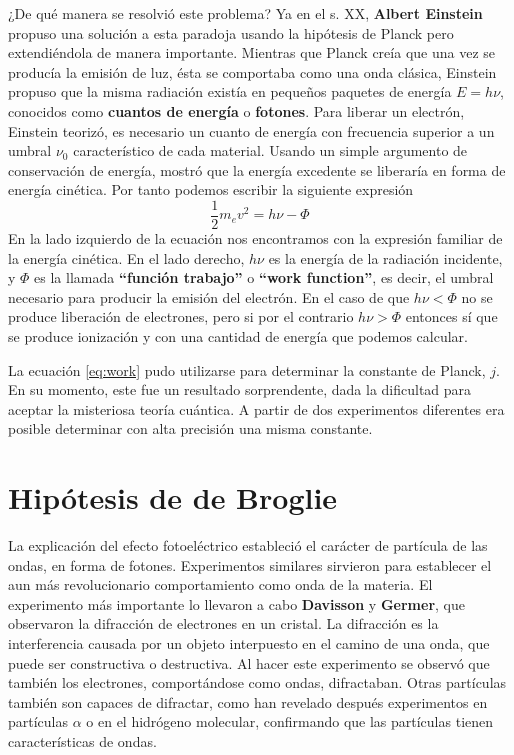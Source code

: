 \documentclass{tufte-handout}
\begin{document}
¿De qué manera se resolvió este problema? Ya en el s. XX, 
\textbf{Albert Einstein} propuso una solución a esta paradoja
usando la hipótesis de Planck pero extendiéndola de manera
importante.
Mientras que Planck creía que una vez se producía la emisión
de luz, ésta se comportaba como una onda clásica, Einstein
propuso que la misma radiación existía en pequeños
paquetes de energía $E=h\nu$, conocidos como 
\textbf{cuantos de energía} o \textbf{fotones}.
Para liberar un electrón, Einstein teorizó, es
necesario un cuanto de energía con frecuencia
superior a un umbral 
$\nu_0$ característico de cada material. 
Usando un simple argumento de conservación de energía,
mostró que la energía excedente se liberaría en forma de energía 
cinética. Por tanto
podemos escribir la siguiente expresión
\begin{equation}
\frac{1}{2}m_ev^2=h\nu - \Phi \label{eq:work}
\end{equation}
En la lado izquierdo de la ecuación nos encontramos con la 
expresión familiar de la energía cinética. En el lado
derecho, $h\nu$ es la energía de la radiación incidente, y 
$\Phi$ es la llamada \textbf{``función trabajo''} o 
\textbf{``work function''}, es decir, el umbral necesario para 
producir la emisión del electrón. En el caso de que
$h\nu<\Phi$ no se produce liberación de electrones, pero si
por el contrario $h\nu>\Phi$ entonces sí que se produce
ionización y con una cantidad de energía que podemos calcular.

La ecuación \ref{eq:work} pudo utilizarse para determinar 
la constante de Planck, $j$. En su momento, este fue un resultado
sorprendente, dada la dificultad para aceptar la misteriosa
teoría cuántica. A partir de dos experimentos diferentes
era posible determinar con alta precisión una misma constante.

\section{Hipótesis de de Broglie}
La explicación del efecto fotoeléctrico estableció el carácter de
partícula de las ondas, en forma de fotones. 
Experimentos similares sirvieron para 
establecer el aun más revolucionario comportamiento como onda 
de la materia. El experimento más importante lo llevaron a cabo 
\textbf{Davisson} y \textbf{Germer}, 
que observaron la difracción de electrones en un cristal. 
La difracción es la interferencia causada por un objeto 
interpuesto en el camino de una onda, que puede ser constructiva
o destructiva. Al hacer este experimento se observó que también 
los electrones, comportándose como ondas, difractaban.
Otras partículas también son capaces de difractar, como han 
revelado después experimentos en partículas $\alpha$ o en
el hidrógeno molecular, confirmando que las partículas tienen
características de ondas. 
\end{document}
